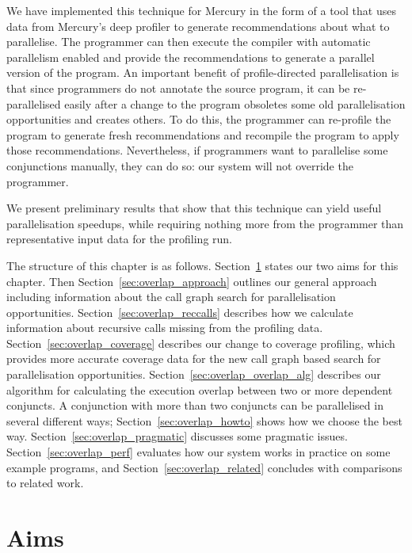 We have implemented this technique for Mercury
in the form of a tool
that uses data from Mercury's deep profiler
to generate recommendations about what to parallelise.
The programmer can then execute the compiler with automatic parallelism
enabled and provide the recommendations to generate a parallel version of
the program.
An important benefit of profile-directed parallelisation is that
since programmers do not annotate the source program,
it can be re-parallelised easily after a change to the program
obsoletes some old parallelisation opportunities and creates others.
To do this, the programmer can re-profile the program to generate fresh
recommendations and recompile the program to apply those recommendations.
Nevertheless, if programmers want to parallelise some conjunctions manually,
they can do so: our system will not override the programmer.

We present preliminary results that show that
this technique can yield useful parallelisation speedups,
while requiring nothing more from the programmer
than representative input data for the profiling run.

The structure of this chapter is as follows.
Section~\ref{sec:overlap_aims} states our two aims for this chapter.
Then Section~\ref{sec:overlap_approach} outlines our general approach
including information about the call graph search for parallelisation
opportunities.
Section~\ref{sec:overlap_reccalls}
describes how we calculate information about recursive calls missing from
the profiling data.
Section~\ref{sec:overlap_coverage}
describes our change to coverage profiling, which provides more accurate
coverage data for the new call graph based search for parallelisation
opportunities.
Section~\ref{sec:overlap_overlap_alg} describes our algorithm for
calculating the execution overlap between two or more dependent conjuncts.
A conjunction with more than two conjuncts can be parallelised
in several different ways;
Section~\ref{sec:overlap_howto} shows how we choose the best way.
Section~\ref{sec:overlap_pragmatic} discusses some pragmatic issues.
Section~\ref{sec:overlap_perf} evaluates
how our system works in practice on some example programs, and
Section~\ref{sec:overlap_related} concludes
with comparisons to related work.

\section{Aims}
\label{sec:overlap_aims}


